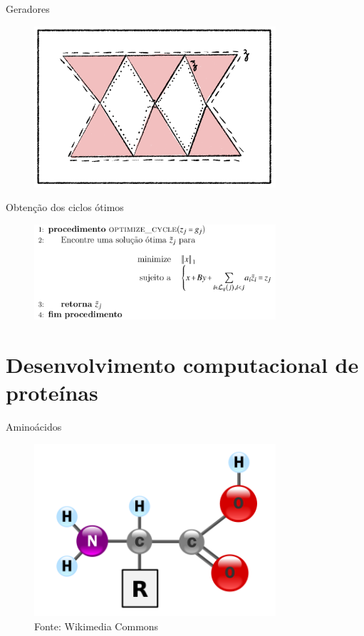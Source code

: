 \documentclass[10pt]{beamer}
\begin{document}
\begin{frame}{Geradores}
    \begin{figure}
        \centering
        \includegraphics[width=0.8\textwidth]{../images/nonoptcyc.png}
    \end{figure}
\end{frame}

\begin{frame}{Obtenção dos ciclos ótimos}
    \begin{figure}
        \centering
        \includegraphics[width=0.8\textwidth]{images/gerotimo.png}
    \end{figure}
\end{frame}

\section{Desenvolvimento computacional de proteínas}

\begin{frame}{Aminoácidos}
    \begin{figure}
        \centering
        \includegraphics[width=0.8\textwidth]{images/aminoacid.png}
        \caption*{Fonte: Wikimedia Commons}
    \end{figure}  
\end{frame}
\end{document}
